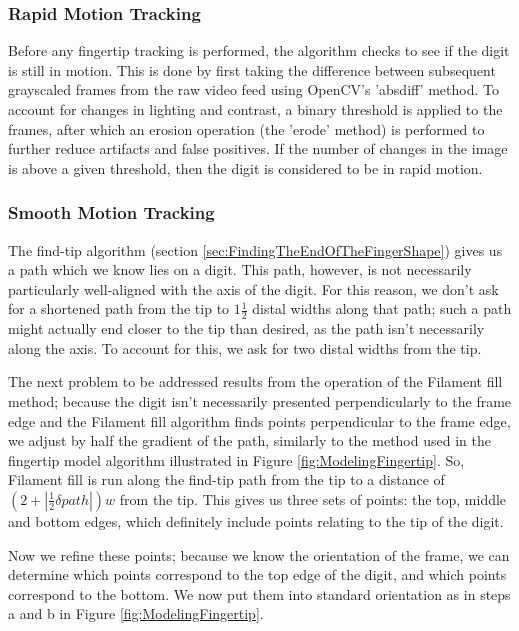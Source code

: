 \subsubsection{Rapid Motion Tracking}\label{sec:RapidMotionTracking}
Before any fingertip tracking is performed, the algorithm checks to see if the digit is still in motion. This is done by first taking the difference between subsequent grayscaled frames from the raw video feed using OpenCV's 'absdiff' method. To account for changes in lighting and contrast, a binary threshold is applied to the frames, after which an erosion operation (the 'erode' method) is performed to further reduce artifacts and false positives. If the number of changes in the image is above a given threshold, then the digit is considered to be in rapid motion.


\subsubsection{Smooth Motion Tracking}\label{sec:SmoothMotionTracking}
The find-tip algorithm (section \ref{sec:FindingTheEndOfTheFingerShape}) gives us a path which we know lies on a digit. This path, however, is not necessarily particularly well-aligned with the axis of the digit. For this reason, we don't ask for a shortened path from the tip to $1 \frac{1}{2}$ distal widths along that path; such a path might actually end closer to the tip than desired, as the path isn't necessarily along the axis. To account for this, we ask for two distal widths from the tip. 

The next problem to be addressed results from the operation of the Filament fill method; because the digit isn't necessarily presented perpendicularly to the frame edge and the Filament fill algorithm finds points perpendicular to the frame edge, we adjust by half the gradient of the path, similarly to the method used in the fingertip model algorithm illustrated in Figure \ref{fig:ModelingFingertip}. So, Filament fill is run along the find-tip path from the tip to a distance of $(2+\left\lvert\frac{1}{2}\delta path\right\lvert)w$ from the tip. This gives us three sets of points: the top, middle and bottom edges, which definitely include points relating to the tip of the digit.

Now we refine these points; because we know the orientation of the frame, we can determine which points correspond to the top edge of the digit, and which points correspond to the bottom. We now put them into standard orientation as in steps a and b in Figure \ref{fig:ModelingFingertip}. 

